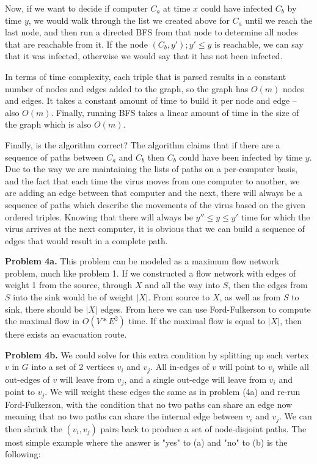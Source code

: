 \documentclass{article}
\begin{document}
Now, if we want to decide if computer $C_a$ at time $x$ could have infected $C_b$ by time $y$, we would walk through the list we created above for $C_a$ until we reach the last node, and then run a directed BFS from that node to determine all nodes that are reachable from it. If the node $(C_b, y'); y' \leq y$ is reachable, we can say that it was infected, otherwise we would say that it has not been infected.

In terms of time complexity, each triple that is parsed results in a constant number of nodes and edges added to the graph, so the graph has $O(m)$ nodes and edges. It takes a constant amount of time to build it per node and edge -- also $O(m)$. Finally, running BFS takes a linear amount of time in the size of the graph which is also $O(m)$.

Finally, is the algorithm correct? The algorithm claims that if there are a sequence of paths between $C_a$ and $C_b$ then $C_b$ could have been infected by time $y$. Due to the way we are maintaining the lists of paths on a per-computer basis, and the fact that each time the virus moves from one computer to another, we are adding an edge between that computer and the next, there will always be a sequence of paths which describe the movements of the virus based on the given ordered triples. Knowing that there will always be $y'' \leq y \leq y'$ time for which the virus arrives at the next computer, it is obvious that we can build a sequence of edges that would result in a complete path. 

\hfill

\textbf{Problem 4a.} This problem can be modeled as a maximum flow network problem, much like problem 1. If we constructed a flow network with edges of weight 1 from the source, through $X$ and all the way into $S$, then the edges from $S$ into the sink would be of weight $|X|$. From source to $X$, as well as from $S$ to sink, there should be $|X|$ edges. From here we can use Ford-Fulkerson \cite{website:4} to compute the maximal flow in $O(V*E^2)$ time. If the maximal flow is equal to $|X|$, then there exists an evacuation route.

\hfill

\textbf{Problem 4b.} We could solve for this extra condition by splitting up each vertex $v$ in $G$ into a set of 2 vertices $v_i$ and $v_j$. All in-edges of $v$ will point to $v_i$ while all out-edges of $v$ will leave from $v_j$, and a single out-edge will leave from $v_i$ and point to $v_j$. We will weight these edges the same as in problem (4a) and re-run Ford-Fulkerson, with the condition that no two paths can share an edge now meaning that no two paths can share the internal edge between $v_i$ and $v_j$. We can then shrink the $(v_i, v_j)$ pairs back to produce a set of node-disjoint paths. The most simple example where the answer is "yes" to (a) and "no" to (b) is the following:
\end{document}
